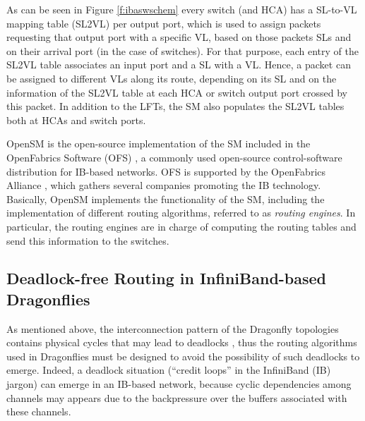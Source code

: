 \documentclass[review]{elsarticle}
\newcommand{\dflys}{Dragonflies}
\newcommand{\dfly}{Dragonfly}
\newcommand{\ib}{IB}
\newcommand{\ibl}{InfiniBand}
\begin{document}
As can be seen in Figure \ref{f:ibaswschem} every switch (and HCA) has a SL-to-VL mapping table (SL2VL) per output port, which is used to assign packets
requesting that output port with a specific VL, based on those packets SLs and on their arrival port (in the case of switches).
For that purpose, each entry of the SL2VL table associates an input port and a SL with a VL.
Hence, a packet can be assigned to different VLs along its route, depending on its SL and on the information of the SL2VL table at each HCA or switch output port crossed by this packet.
In addition to the LFTs, the SM also populates the SL2VL tables both at HCAs and switch ports.

OpenSM \cite{opensm} is the open-source implementation of the SM included in the OpenFabrics Software (OFS) \cite{web_ofa}, a commonly used open-source control-software distribution for \ib-based networks.
OFS is supported by the OpenFabrics Alliance \cite{web_ofa}, which gathers several companies promoting the \ib{} technology.
Basically, OpenSM implements the functionality of the SM, including the implementation of different routing algorithms, referred to as \emph{routing engines}.
In particular, the routing engines are in charge of computing the routing tables and send this information to the switches.

\subsection{Deadlock-free Routing in \ibl-based \dflys{}}
\label{s_background_ibrouting}

As mentioned above, the interconnection pattern of the \dfly{} topologies contains physical cycles that may lead to deadlocks \cite{dally_principles_2003},
thus the routing algorithms used in \dflys{} must be designed to avoid the possibility of such deadlocks to emerge.
Indeed, a deadlock situation (``credit loops'' in the \ibl{} (\ib{}) jargon) can emerge in an \ib-based network,
because cyclic dependencies among channels may appears due to the backpressure over the buffers associated with these channels.
\end{document}
